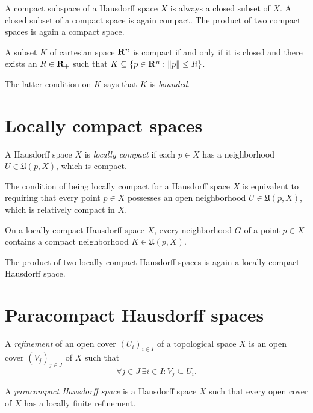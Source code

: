 A compact subspace of a Hausdorff space $X$ is always a closed subset of $X$. A closed
subset of a compact space is again compact. The product of two compact spaces
is again a compact space.

\begin{thm}
  A subset $K$ of cartesian space $\mathbf{R}^n$ is compact if and only if it is closed
  and there exists an $R \in \mathbf{R}_+$ such that $K \subseteq \lbrace p \in \mathbf{R}^n : \lVert p\rVert \leq R\rbrace$.
\end{thm}

The latter condition on $K$ says that $K$ is \emph{bounded}.

\section{Locally compact spaces}
\label{sec:locally_compact}

\begin{dfn}
  A Hausdorff space $X$ is \emph{locally compact} if each $p \in X$ has a
  neighborhood $U \in \mathfrak U(p, X)$, which is compact.
\end{dfn}
The condition of being locally compact for a Hausdorff space $X$ is equivalent to
requiring that every point $p \in X$ possesses an open neighborhood $U \in \mathfrak U(p, X)$,
which is relatively compact in $X$.

\begin{prop}
  \label{prop:locally_compact}
  On a locally compact Hausdorff space $X$, every neighborhood $G$ of a point $p \in X$
  contains a compact neighborhood $K \in \mathfrak U(p, X)$.
\end{prop}

The product of two locally compact Hausdorff spaces is again a locally compact
Hausdorff space.

\section{Paracompact Hausdorff spaces}
\label{sec:paracompactness}

A \emph{refinement} of an open cover $(U_i)_{i \in I}$ of a topological space $X$
is an open cover $(V_j)_{j \in J}$ of $X$ such that
\[
  \forall j \in J \, \exists i \in I: V_j \subseteq U_i.
\]

\begin{dfn}
  A \emph{paracompact Hausdorff space} is a Hausdorff space $X$ such that every
  open cover of $X$ has a locally finite refinement.
\end{dfn}


